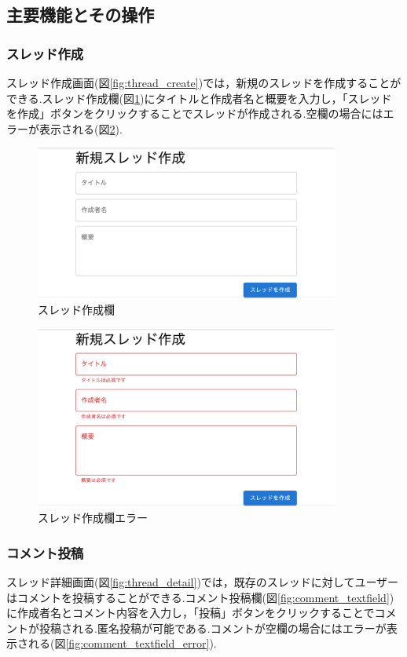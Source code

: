 \documentclass[b5paper,12pt,dvipdfmx]{jsreport}
\begin{document}
\subsection{主要機能とその操作}



\subsubsection{スレッド作成}
スレッド作成画面(図\ref{fig:thread_create})では，新規のスレッドを作成することができる.スレッド作成欄(図\ref{fig:thread_textfield})にタイトルと作成者名と概要を入力し，「スレッドを作成」ボタンをクリックすることでスレッドが作成される.空欄の場合にはエラーが表示される(図\ref{fig:thread_textfield_error}).

\begin{figure}[H]
	\centering
    \includegraphics[width=100mm,height=50.81mm]{./img/feature/thread_textfield.png}
	\caption{スレッド作成欄}
	\label{fig:thread_textfield}
\end{figure}

\begin{figure}[H]
	\centering
    \includegraphics[width=100mm,height=60.05mm]{./img/feature/thread_textfield_error.png}
	\caption{スレッド作成欄エラー}
	\label{fig:thread_textfield_error}
\end{figure}

\subsubsection{コメント投稿}
スレッド詳細画面(図\ref{fig:thread_detail})では，既存のスレッドに対してユーザーはコメントを投稿することができる.コメント投稿欄(図\ref{fig:comment_textfield})に作成者名とコメント内容を入力し，「投稿」ボタンをクリックすることでコメントが投稿される.匿名投稿が可能である.コメントが空欄の場合にはエラーが表示される(図\ref{fig:comment_textfield_error}).
\end{document}
